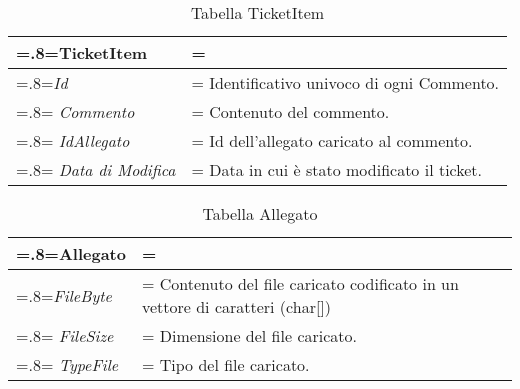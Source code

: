     			\smallskip      

 \begin{table}[H]
                \centering
                \renewcommand{\arraystretch}{1.8}
                \renewcommand\tabularxcolumn[1]{m{#1}}
                \begin{tabularx}{0.9\textwidth} {
                    >{\hsize=.8\hsize\linewidth=\hsize}X
                    >{\hsize=1.2\hsize\linewidth=\hsize}X}
                    \textbf{TicketItem}\\
                    \hline
                     \textit{Id} & Identificativo univoco di ogni Commento. \\
                    \hline
                    \textit{Commento} & Contenuto del commento. \\
                    \hline
                    \textit{IdAllegato} & Id dell'allegato caricato al commento. \\
                    \hline
                    \textit{Data di Modifica} & Data in cui è stato modificato il ticket. \\
                    \hline
                \end{tabularx}
                \smallskip
                \caption{Tabella TicketItem}
            \end{table}
            \smallskip
            
 \begin{table}[H]
                \centering
                \renewcommand{\arraystretch}{1.8}
                \renewcommand\tabularxcolumn[1]{m{#1}}
                \begin{tabularx}{0.9\textwidth} {
                    >{\hsize=.8\hsize\linewidth=\hsize}X
                    >{\hsize=1.2\hsize\linewidth=\hsize}X}
                    \textbf{Allegato}\\
                    \hline
                    \textit{FileByte} & Contenuto del file caricato codificato in un vettore di caratteri (char[]) \\
                    \hline
                    \textit{FileSize} & Dimensione del file caricato. \\
                    \hline
                    \textit{TypeFile} & Tipo del file caricato. \\
                    \hline
                \end{tabularx}
                \smallskip
                \caption{Tabella Allegato}
            \end{table}
            
